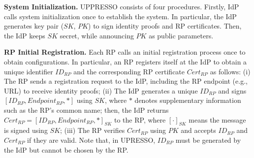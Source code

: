 \noindent \textbf{System Initialization.} UPPRESSO consists of four procedures. Firstly, IdP calls system initialization once to establish the system. 
In particular, the IdP generates key pair ($SK$, $PK$) to sign identity proofs and RP certificates.
Then, the IdP keeps $SK$ secret, while announcing %
$PK$ as public parameters.

\noindent\textbf{RP Initial Registration.} Each RP calls an initial registration process once to obtain configurations. In particular, an RP registers itself at the IdP to obtain a unique identifier $ID_{RP}$ and the corresponding RP certificate $Cert_{RP}$ as follows: (i) The RP sends 
a registration request to the IdP, including 
the RP endpoint (e.g., URL) to receive identity proofs; (ii) The IdP generates a unique $ID_{RP}$ and signs $[ID_{RP}, Endpoint_{RP}, *]$ using $SK$, where $*$ denotes supplementary information such as the RP's common name; then, the IdP returns $Cert_{RP} = [ID_{RP}, Endpoint_{RP}, *]_{SK}$ to the RP, where $[\cdot]_{SK}$ means the message is signed using $SK$; (iii) The RP verifies $Cert_{RP}$ using $PK$ and accepts $ID_{RP}$ and $Cert_{RP}$ if they are valid.
Note that, in UPRESSO, $ID_{RP}$ must be generated by the IdP but cannot be chosen by the RP.%


